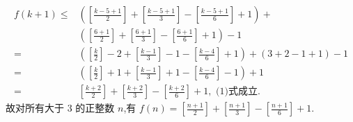 $$
\begin{aligned}
f(k+1) \leqslant & \left(\left[\frac{k-5+1}{2}\right]+\left[\frac{k-5+1}{3}\right]-\left[\frac{k-5+1}{6}\right]+1\right)+ \\
& \left(\left[\frac{6+1}{2}\right]+\left[\frac{6+1}{3}\right]-\left[\frac{6+1}{6}\right]+1\right)-1 \\
= & \left(\left[\frac{k}{2}\right]-2+\left[\frac{k-1}{3}\right]-1-\left[\frac{k-4}{6}\right]+1\right)+(3+2-1+1)-1 \\
= & \left(\left[\frac{k}{2}\right]+1+\left[\frac{k-1}{3}\right]+1-\left[\frac{k-4}{6}\right]-1\right)+1 \\
= & {\left[\frac{k+2}{2}\right]+\left[\frac{k+2}{3}\right]-\left[\frac{k+2}{6}\right]+1, \text { (1)式成立.
} }
\end{aligned}
$$
故对所有大于 3 的正整数 $n$,有 $f(n)=\left[\frac{n+1}{2}\right]+\left[\frac{n+1}{3}\right]-\left[\frac{n+1}{6}\right]+1$.



